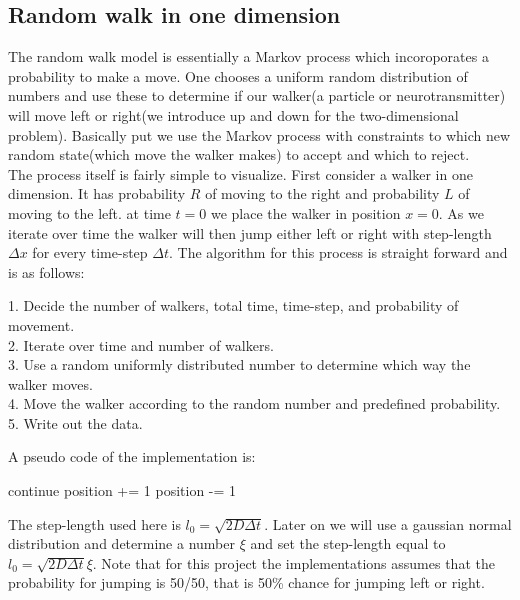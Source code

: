 \documentclass[a4paper,11pt]{article}
\newenvironment{tabbed}{\begin{addmargin}{0.2cm}}{\end{addmargin}} %
\newcommand{\vsp}{\vspace{0.2cm}} %
\begin{document}
\subsection{Random walk in one dimension}
    The random walk model is essentially a Markov process which incoroporates a probability to make a move. One chooses a uniform random distribution of numbers and use these to determine if our walker(a particle or neurotransmitter) will move left or right(we introduce up and down for the two-dimensional problem). Basically put we use the Markov process with constraints to which new random state(which move the walker makes) to accept and which to reject.\vsp \\
    The process itself is fairly simple to visualize. First consider a walker in one dimension. It has probability $R$ of moving to the right and probability $L$ of moving to the left. at time $t=0$ we place the walker in position $x=0$. As we iterate over time the walker will then jump either left or right with step-length $\Delta x$ for every time-step $\Delta t$.
    The algorithm for this process is straight forward and is as follows:
    \begin{tabbed}
        1. Decide the number of walkers, total time, time-step, and probability of movement.\\
        2. Iterate over time and number of walkers.\\
        3. Use a random uniformly distributed number to determine which way the walker moves.\\
        4. Move the walker according to the random number and predefined probability.\\
        5. Write out the data.
    \end{tabbed} \vsp
    A pseudo code of the implementation is:
        \begin{algorithmic}
                        \State continue
                    \EndIf
                        \State position += 1
                    \Else
                        \State position -= 1
                    \EndIf
                \EndFor
            \EndFor
        \end{algorithmic}
    The step-length used here is $l_0=\sqrt{2D\Delta t}$. Later on we will use a gaussian normal distribution and determine a number $\xi$ and set the step-length equal to $l_0=\sqrt{2D\Delta t}\xi$. Note that for this project the implementations assumes that the probability for jumping is 50/50, that is 50\% chance for jumping left or right.
\end{document}
